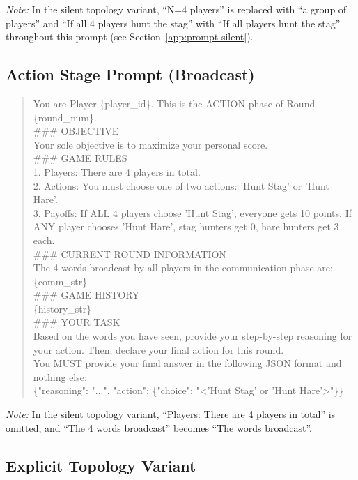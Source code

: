 \documentclass[runningheads]{llncs}
\begin{document}
\noindent\textit{Note:} In the silent topology variant, ``N=4 players'' is replaced with ``a group of players'' and ``If all 4 players hunt the stag'' with ``If all players hunt the stag'' throughout this prompt (see Section~\ref{app:prompt-silent}).


\subsection{Action Stage Prompt (Broadcast)}\label{app:prompt-action}

\begin{quote}
\small\ttfamily
You are Player \{player\_id\}. This is the ACTION phase of Round \{round\_num\}.\\[4pt]
\#\#\# OBJECTIVE\\
Your sole objective is to maximize your personal score.\\[4pt]
\#\#\# GAME RULES\\
1. Players: There are 4 players in total.\\
2. Actions: You must choose one of two actions: 'Hunt Stag' or 'Hunt Hare'.\\
3. Payoffs: If ALL 4 players choose 'Hunt Stag', everyone gets 10 points. If ANY player chooses 'Hunt Hare', stag hunters get 0, hare hunters get 3 each.\\[4pt]
\#\#\# CURRENT ROUND INFORMATION\\
The 4 words broadcast by all players in the communication phase are:\\
\{comm\_str\}\\[4pt]
\#\#\# GAME HISTORY\\
\{history\_str\}\\[4pt]
\#\#\# YOUR TASK\\
Based on the words you have seen, provide your step-by-step reasoning for your action. Then, declare your final action for this round.\\[4pt]
You MUST provide your final answer in the following JSON format and nothing else:\\
\{"reasoning": "...", "action": \{"choice": "<'Hunt Stag' or 'Hunt Hare'>"\}\}
\end{quote}

\noindent\textit{Note:} In the silent topology variant, ``Players: There are 4 players in total'' is omitted, and ``The 4 words broadcast'' becomes ``The words broadcast''.


\subsection{Explicit Topology Variant}\label{app:prompt-topology}
\end{document}
